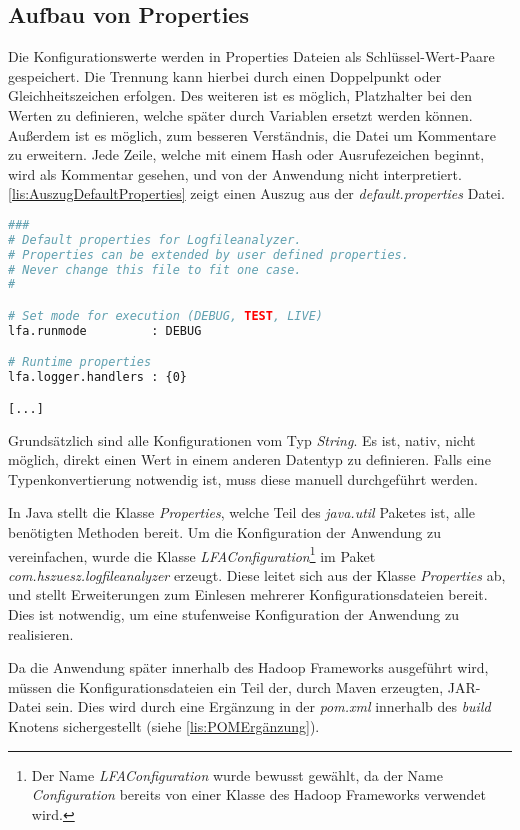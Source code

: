 \subsection{Aufbau von Properties}
Die Konfigurationswerte werden in Properties Dateien als Schlüssel-Wert-Paare gespeichert. Die Trennung kann hierbei durch einen Doppelpunkt oder Gleichheitszeichen erfolgen. Des weiteren ist es möglich, Platzhalter bei den Werten zu definieren, welche später durch Variablen ersetzt werden können. Außerdem ist es möglich, zum besseren Verständnis, die Datei um Kommentare zu erweitern. Jede Zeile, welche mit einem Hash oder Ausrufezeichen beginnt, wird als Kommentar gesehen, und von der Anwendung nicht interpretiert. \autoref{lis:AuszugDefaultProperties} zeigt einen Auszug aus der \textit{default.properties} Datei. \\

\begin{lstlisting}[language=Bash,caption=Auszug aus default.properties,label=lis:AuszugDefaultProperties]
###
# Default properties for Logfileanalyzer.
# Properties can be extended by user defined properties.
# Never change this file to fit one case.
#

# Set mode for execution (DEBUG, TEST, LIVE)
lfa.runmode         : DEBUG

# Runtime properties
lfa.logger.handlers : {0}

[...]
\end{lstlisting}

Grundsätzlich sind alle Konfigurationen vom Typ \textit{String}. Es ist, nativ, nicht möglich, direkt einen Wert in einem anderen Datentyp zu definieren. Falls eine Typenkonvertierung notwendig ist, muss diese manuell durchgeführt werden.

In Java stellt die Klasse \textit{Properties}, welche Teil des \textit{java.util} Paketes ist, alle benötigten Methoden bereit. Um die Konfiguration der Anwendung zu vereinfachen, wurde die Klasse \textit{LFAConfiguration}\footnote{Der Name \textit{LFAConfiguration} wurde bewusst gewählt, da der Name \textit{Configuration} bereits von einer Klasse des Hadoop Frameworks verwendet wird.} im Paket \textit{com.hszuesz.logfileanalyzer} erzeugt. Diese leitet sich aus der Klasse \textit{Properties} ab, und stellt Erweiterungen zum Einlesen mehrerer Konfigurationsdateien bereit. Dies ist notwendig, um eine stufenweise Konfiguration der Anwendung zu realisieren.

Da die Anwendung später innerhalb des Hadoop Frameworks ausgeführt wird, müssen die Konfigurationsdateien ein Teil der, durch Maven erzeugten, JAR-Datei sein. Dies wird durch eine Ergänzung in der \textit{pom.xml} innerhalb des \textit{build} Knotens sichergestellt (siehe \autoref{lis:POMErgänzung}). \\

